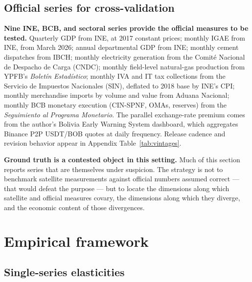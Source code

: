 \documentclass[11pt,letterpaper]{article}
\newcommand{\claim}[1]{\textbf{#1.}}
\begin{document}


\subsection{Official series for cross-validation}

\claim{Nine INE, BCB, and sectoral series provide the official measures to be tested} Quarterly GDP from INE, at \num{2017} constant prices; monthly IGAE from INE, from March \num{2026}; annual departmental GDP from INE; monthly cement dispatches from IBCH; monthly electricity generation from the Comité Nacional de Despacho de Carga (CNDC); monthly field-level natural-gas production from YPFB's \emph{Boletín Estadístico}; monthly IVA and IT tax collections from the Servicio de Impuestos Nacionales (SIN), deflated to \num{2018} base by INE's CPI; monthly merchandise imports by volume and value from Aduana Nacional; monthly BCB monetary execution (CIN-SPNF, OMAs, reserves) from the \emph{Seguimiento al Programa Monetario}. The parallel exchange-rate premium comes from the author's Bolivia Early Warning System dashboard, which aggregates Binance P2P USDT/BOB quotes at daily frequency. Release cadence and revision behavior appear in Appendix Table~\ref{tab:vintages}.

\claim{Ground truth is a contested object in this setting} Much of this section reports series that are themselves under suspicion. The strategy is not to benchmark satellite measurements against official numbers assumed correct --- that would defeat the purpose --- but to locate the dimensions along which satellite and official measures covary, the dimensions along which they diverge, and the economic content of those divergences.

\section{Empirical framework}
\label{sec:empirical}

\subsection{Single-series elasticities}
\end{document}
